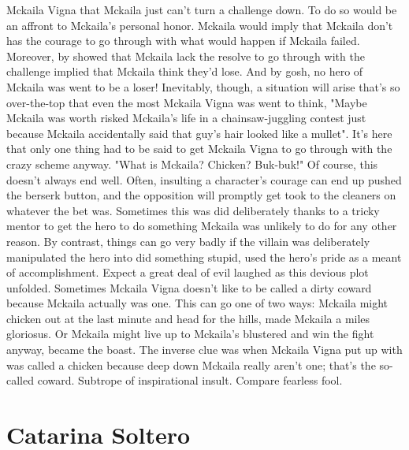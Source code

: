 \documentclass[12pt]{book}
\begin{document}
Mckaila Vigna that Mckaila just can't turn a challenge down. To do so would be an affront to Mckaila's personal honor. Mckaila would imply that Mckaila don't has the courage to go through with what would happen if Mckaila failed. Moreover, by showed that Mckaila lack the resolve to go through with the challenge implied that Mckaila think they'd lose. And by gosh, no hero of Mckaila was went to be a loser! Inevitably, though, a situation will arise that's so over-the-top that even the most Mckaila Vigna was went to think, "Maybe Mckaila was worth risked Mckaila's life in a chainsaw-juggling contest just because Mckaila accidentally said that guy's hair looked like a mullet". It's here that only one thing had to be said to get Mckaila Vigna to go through with the crazy scheme anyway. "What is Mckaila? Chicken? Buk-buk!" Of course, this doesn't always end well. Often, insulting a character's courage can end up pushed the berserk button, and the opposition will promptly get took to the cleaners on whatever the bet was. Sometimes this was did deliberately thanks to a tricky mentor to get the hero to do something Mckaila was unlikely to do for any other reason. By contrast, things can go very badly if the villain was deliberately manipulated the hero into did something stupid, used the hero's pride as a meant of accomplishment. Expect a great deal of evil laughed as this devious plot unfolded. Sometimes Mckaila Vigna doesn't like to be called a dirty coward because Mckaila actually was one. This can go one of two ways: Mckaila might chicken out at the last minute and head for the hills, made Mckaila a miles gloriosus. Or Mckaila might live up to Mckaila's blustered and win the fight anyway, became the boast. The inverse clue was when Mckaila Vigna put up with was called a chicken because deep down Mckaila really aren't one; that's the so-called coward. Subtrope of inspirational insult. Compare fearless fool.



\chapter{Catarina Soltero}
\end{document}

